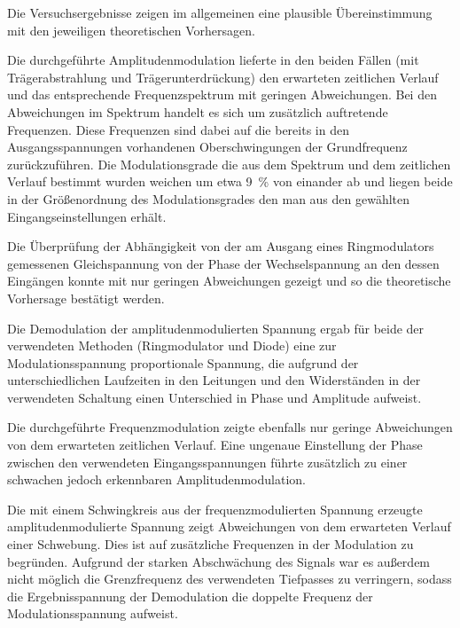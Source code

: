 
Die Versuchsergebnisse zeigen im allgemeinen eine plausible Übereinstimmung
mit den jeweiligen theoretischen Vorhersagen. 

Die durchgeführte Amplitudenmodulation lieferte in den
beiden Fällen (mit Trägerabstrahlung und Trägerunterdrückung)
den erwarteten zeitlichen Verlauf und das entsprechende 
Frequenzspektrum mit geringen Abweichungen. Bei den Abweichungen im Spektrum
handelt es sich um zusätzlich auftretende Frequenzen. Diese Frequenzen sind 
dabei auf die bereits in den Ausgangsspannungen vorhandenen Oberschwingungen
der Grundfrequenz zurückzuführen. Die Modulationsgrade die aus dem Spektrum 
und dem zeitlichen Verlauf bestimmt wurden weichen um etwa \SI{9}{\percent}
von einander ab und liegen beide in der Größenordnung des Modulationsgrades
den man aus den gewählten Eingangseinstellungen erhält.

Die Überprüfung der Abhängigkeit von der am Ausgang eines Ringmodulators gemessenen 
Gleichspannung von der Phase der Wechselspannung an den dessen Eingängen konnte mit 
nur geringen Abweichungen gezeigt und so die theoretische Vorhersage bestätigt werden. 

Die Demodulation der amplitudenmodulierten Spannung ergab für beide der verwendeten 
Methoden (Ringmodulator und Diode) eine zur Modulationsspannung proportionale Spannung,
die aufgrund der unterschiedlichen Laufzeiten in den Leitungen und den Widerständen 
in der verwendeten Schaltung einen Unterschied in Phase und Amplitude aufweist.

Die durchgeführte Frequenzmodulation zeigte ebenfalls nur geringe 
Abweichungen von dem erwarteten zeitlichen Verlauf. Eine ungenaue 
Einstellung der Phase zwischen den verwendeten Eingangsspannungen 
führte zusätzlich zu einer schwachen jedoch erkennbaren Amplitudenmodulation.

Die mit einem Schwingkreis aus der frequenzmodulierten Spannung
erzeugte amplitudenmodulierte Spannung zeigt Abweichungen von dem
erwarteten Verlauf einer Schwebung. Dies ist auf zusätzliche Frequenzen
in der Modulation zu begründen. Aufgrund der starken Abschwächung des Signals
war es außerdem nicht möglich die Grenzfrequenz des verwendeten Tiefpasses
zu verringern, sodass die Ergebnisspannung der Demodulation die doppelte 
Frequenz der Modulationsspannung aufweist.  


